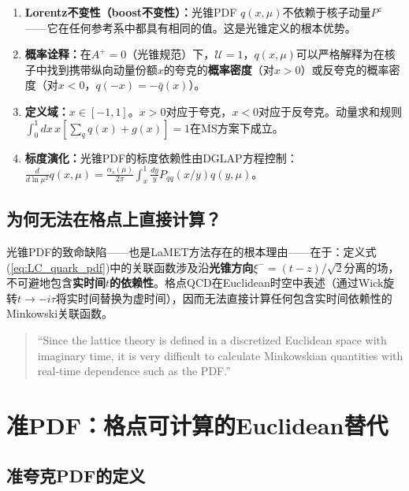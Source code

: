 \documentclass[12pt,a4paper]{ctexart}
\theoremstyle{definition}
\begin{document}
\begin{enumerate}
    \item \textbf{Lorentz不变性（boost不变性）：}光锥PDF $q(x,\mu)$不依赖于核子动量$P^z$——它在任何参考系中都具有相同的值\cite{Ji2014LaMET}。这是光锥定义的根本优势。

    \item \textbf{概率诠释：}在$A^+ = 0$（光锥规范）下，$\mathcal{U} = 1$，$q(x,\mu)$可以严格解释为在核子中找到携带纵向动量份额$x$的夸克的\textbf{概率密度}（对$x>0$）或反夸克的概率密度（对$x<0$，$q(-x) = -\bar{q}(x)$）。

    \item \textbf{定义域：}$x \in [-1, 1]$。$x>0$对应于夸克，$x<0$对应于反夸克。动量求和规则$\int_0^1 dx\, x[\sum_q q(x) + g(x)] = 1$在$\overline{\text{MS}}$方案下成立\cite{Fan2018gluon}。

    \item \textbf{标度演化：}光锥PDF的标度依赖性由DGLAP方程控制：$\frac{d}{d\ln\mu^2} q(x,\mu) = \frac{\alpha_s(\mu)}{2\pi} \int_x^1 \frac{dy}{y} P_{qq}(x/y) q(y,\mu)$。
\end{enumerate}

\subsection{为何无法在格点上直接计算？}

光锥PDF的致命缺陷——也是LaMET方法存在的根本理由——在于：定义式(\ref{eq:LC_quark_pdf})中的关联函数涉及沿\textbf{光锥方向}$\xi^- = (t-z)/\sqrt{2}$分离的场，不可避地包含\textbf{实时间$t$的依赖性}。格点QCD在Euclidean时空中表述（通过Wick旋转$t \to -i\tau$将实时间替换为虚时间），因而无法直接计算任何包含实时间依赖性的Minkowski关联函数\cite{Izubuchi2018}。

\begin{quote}
``Since the lattice theory is defined in a discretized Euclidean space with imaginary time, it is very difficult to calculate Minkowskian quantities with real-time dependence such as the PDF.''\cite{Izubuchi2018}
\end{quote}

\section{准PDF：格点可计算的Euclidean替代}

\subsection{准夸克PDF的定义}
\end{document}
